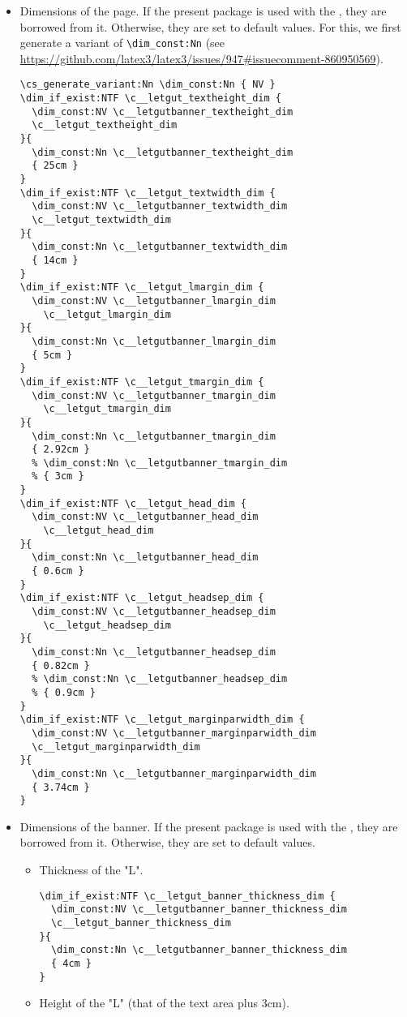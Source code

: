 \documentclass{letgut}
\begin{document}
\begin{itemize}
\item Dimensions of the page. If the present package is used with the
, they are borrowed from it. Otherwise, they are set to default
values. For this, we first generate a variant of \lstinline+\dim_const:Nn+ (see
\url{https://github.com/latex3/latex3/issues/947\#issuecomment-860950569}).
\begin{lstlisting}
\cs_generate_variant:Nn \dim_const:Nn { NV }
\dim_if_exist:NTF \c__letgut_textheight_dim {
  \dim_const:NV \c__letgutbanner_textheight_dim
  \c__letgut_textheight_dim
}{
  \dim_const:Nn \c__letgutbanner_textheight_dim
  { 25cm }
}
\dim_if_exist:NTF \c__letgut_textwidth_dim {
  \dim_const:NV \c__letgutbanner_textwidth_dim
  \c__letgut_textwidth_dim
}{
  \dim_const:Nn \c__letgutbanner_textwidth_dim
  { 14cm }
}
\dim_if_exist:NTF \c__letgut_lmargin_dim {
  \dim_const:NV \c__letgutbanner_lmargin_dim
    \c__letgut_lmargin_dim
}{
  \dim_const:Nn \c__letgutbanner_lmargin_dim
  { 5cm }
}
\dim_if_exist:NTF \c__letgut_tmargin_dim {
  \dim_const:NV \c__letgutbanner_tmargin_dim
    \c__letgut_tmargin_dim
}{
  \dim_const:Nn \c__letgutbanner_tmargin_dim
  { 2.92cm }
  % \dim_const:Nn \c__letgutbanner_tmargin_dim
  % { 3cm }
}
\dim_if_exist:NTF \c__letgut_head_dim {
  \dim_const:NV \c__letgutbanner_head_dim
    \c__letgut_head_dim
}{
  \dim_const:Nn \c__letgutbanner_head_dim
  { 0.6cm }
}
\dim_if_exist:NTF \c__letgut_headsep_dim {
  \dim_const:NV \c__letgutbanner_headsep_dim
    \c__letgut_headsep_dim
}{
  \dim_const:Nn \c__letgutbanner_headsep_dim
  { 0.82cm }
  % \dim_const:Nn \c__letgutbanner_headsep_dim
  % { 0.9cm }
}
\dim_if_exist:NTF \c__letgut_marginparwidth_dim {
  \dim_const:NV \c__letgutbanner_marginparwidth_dim
  \c__letgut_marginparwidth_dim
}{
  \dim_const:Nn \c__letgutbanner_marginparwidth_dim
  { 3.74cm }
}
\end{lstlisting}
\item Dimensions of the banner. If the present package is used with the
, they are borrowed from it. Otherwise, they are set to
default values.
\begin{itemize}
\item Thickness of the "L".
\begin{lstlisting}
\dim_if_exist:NTF \c__letgut_banner_thickness_dim {
  \dim_const:NV \c__letgutbanner_banner_thickness_dim
  \c__letgut_banner_thickness_dim
}{
  \dim_const:Nn \c__letgutbanner_banner_thickness_dim
  { 4cm }
}
\end{lstlisting}
\item Height of the "L" (that of the text area plus 3cm).

\end{itemize}
\end{itemize}
\end{document}
